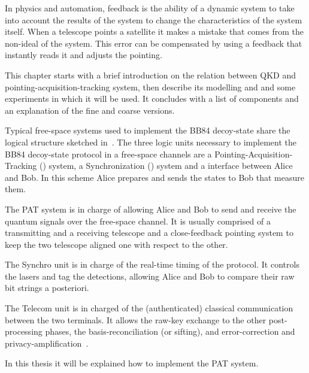 In physics and automation, feedback is the ability of a dynamic system to take into account the results of the system to change the characteristics of the system itself. When a telescope points a satellite it makes a mistake that comes from the non-ideal of the system. This error can be compensated by using a feedback that instantly reads it and adjusts the pointing.

This chapter starts with a brief introduction on the relation between QKD and pointing-acquisition-tracking system, then describe its modelling and and some experiments in which it will be used. It concludes with a list of components and an explanation of the fine and coarse versions.


Typical free-space systems used to implement the BB84 decoy-state share the logical structure sketched in~. The three logic units necessary to implement the BB84 decoy-state protocol in a free-space channels are a Pointing-Acquisition-Tracking () system, a Synchronization () system and a  interface between Alice and Bob. In this scheme  Alice prepares and sends the states to Bob that measure them.

The PAT system is in charge of allowing Alice and Bob to send and receive the quantum signals over the free-space channel. It is usually comprised of a transmitting and a receiving telescope and a close-feedback pointing system to keep the two telescope aligned one with respect to the other.

The Synchro unit is in charge of the real-time timing of the protocol. It controls the lasers and tag the detections, allowing Alice and Bob to compare their raw bit strings a posteriori.

The Telecom unit is in charged of the (authenticated) classical communication between the two terminals. It allows the raw-key exchange to the other post-processing phases, the basis-reconciliation (or sifting), and error-correction and privacy-amplification~\cite{a9}.

In this thesis it will be explained how to implement the PAT system.

